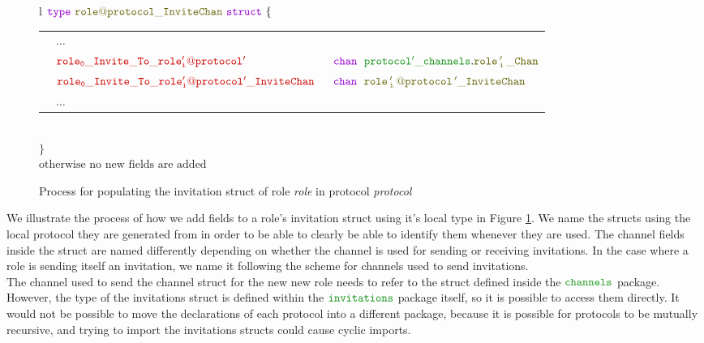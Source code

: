 \documentclass[12pt,twoside]{report}
\begin{document}
\begin{figure}[!h]
\begin{center}
\begin{tabular}{l}
            {\footnotesize
            $\gotype\ \structname{\localprotocol{role}{protocol}\_InviteChan}\ \gostruct\ \{$}\\[3pt]

            {\footnotesize
            \begin{tabular}{lll}
                \indent & $\dots$ & \\[9pt]
                \indent & $\structfield{role_0\_Invite\_To\_\localprotocol{role'_i}{protocol'}}$\ &$\gochan\ \;\pkgstructaccess{protocol'\_channels}{role\,'_i\,\_Chan}$\\
                \indent & $\structfield{role_0\_Invite\_To\_\localprotocol{role'_i}{protocol'}\_InviteChan}$\ &$\gochan\ \; \structname{\localprotocol{role\,'_i\,}{protocol\,'}\_InviteChan}$\\
                [7pt]
                \indent & $\dots$ & 
            \end{tabular}}\\
            {\footnotesize$\}$}\\[6pt]
            
            $\text{otherwise\ no\ new\ fields\ are\ added}$
            
        \end{tabular}
    \end{center}
    \caption{Process for populating the invitation struct of role \textit{role} in protocol \textit{protocol}}
    \label{invitation-struct-gen}
\end{figure}

We illustrate the process of how we add fields to a role's invitation struct using it's local type in Figure \ref{invitation-struct-gen}. We name the structs using the local protocol they are generated from in order to be able to clearly be able to identify them whenever they are used. The channel fields inside the struct are named differently depending on whether the channel is used for sending or receiving invitations. In the case where a role is sending itself an invitation, we name it following the scheme for channels used to send invitations.\\

The channel used to send the channel struct for the new new role needs to refer to the struct defined inside the $\pkgname{channels}$ package. However, the type of the invitations struct is defined within the $\pkgname{invitations}$ package itself, so it is possible to access them directly. It would not be possible to move the declarations of each protocol into a different package, because it is possible for protocols to be mutually recursive, and trying to import the invitations structs could cause cyclic imports.\\
\end{document}
